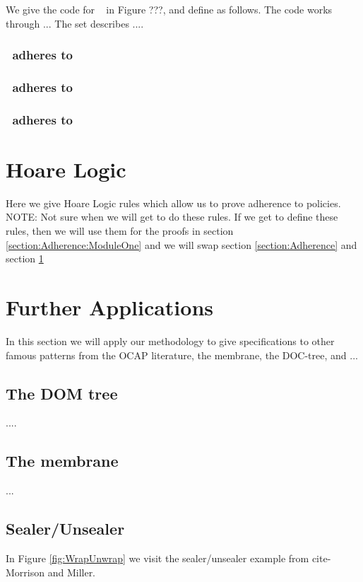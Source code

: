 We give the code for \MTwo~ in Figure ???, and define  as follows.
The code works through ...
The set   describes ....


\subsubsection{\MTwo~adheres to }

\subsubsection{\MTwo~adheres to }

\subsubsection{\MTwo~adheres to }


\section{Hoare Logic}
\label{section:Hoare}
Here we give Hoare Logic rules which allow us to prove adherence to policies.
NOTE: Not sure when we will get to do these rules. If we get to define these rules, then we will use them for the proofs
 in section \ref{section:Adherence:ModuleOne}
and we will swap section \ref{section:Adherence} and section \ref{section:Hoare}

\section{Further Applications}
In this section we will apply our methodology to give specifications to other famous patterns from the OCAP literature,
\ie the membrane, the DOC-tree, and ...

\subsection{The DOM tree}
....

\subsection{The membrane}
...

\subsection{Sealer/Unsealer}

In Figure \ref{fig:WrapUnwrap} we visit the sealer/unsealer example  from cite-Morrison and Miller.


